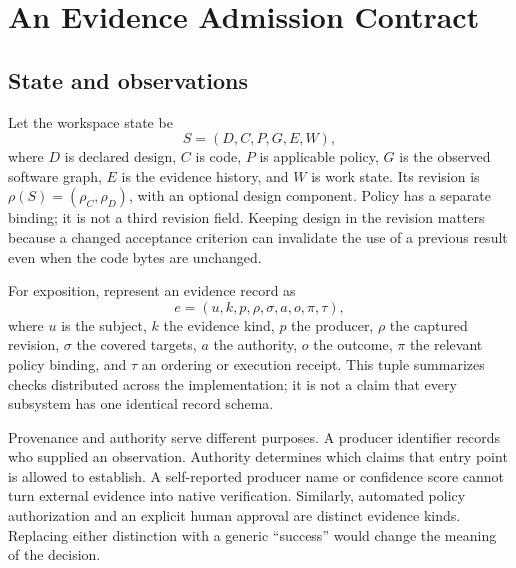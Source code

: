 \section{An Evidence Admission Contract}
\label{sec:contract}
\subsection{State and observations}
Let the workspace state be
\begin{equation}
 S=(D,C,P,G,E,W),
\end{equation}
where $D$ is declared design, $C$ is code, $P$ is applicable policy, $G$ is the observed software graph, $E$ is the evidence history, and $W$ is work state. Its revision is $\rho(S)=(\rho_C,\rho_D)$, with an optional design component. Policy has a separate binding; it is not a third revision field. Keeping design in the revision matters because a changed acceptance criterion can invalidate the use of a previous result even when the code bytes are unchanged.

For exposition, represent an evidence record as
\begin{equation}
 e=(u,k,p,\rho,\sigma,a,o,\pi,\tau),
\end{equation}
where $u$ is the subject, $k$ the evidence kind, $p$ the producer, $\rho$ the captured revision, $\sigma$ the covered targets, $a$ the authority, $o$ the outcome, $\pi$ the relevant policy binding, and $\tau$ an ordering or execution receipt. This tuple summarizes checks distributed across the implementation; it is not a claim that every subsystem has one identical record schema.

Provenance and authority serve different purposes. A producer identifier records who supplied an observation. Authority determines which claims that entry point is allowed to establish. A self-reported producer name or confidence score cannot turn external evidence into native verification. Similarly, automated policy authorization and an explicit human approval are distinct evidence kinds. Replacing either distinction with a generic ``success'' would change the meaning of the decision.

